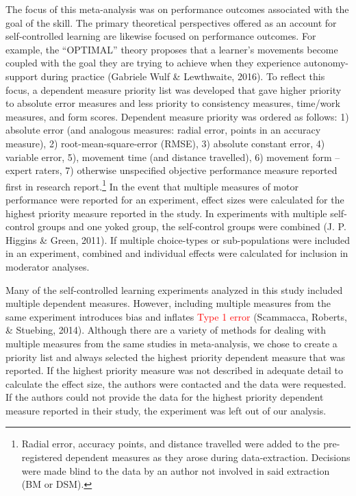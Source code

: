 \documentclass[
  english,
  man,floatsintext]{apa7}
\begin{document}
The focus of this meta-analysis was on performance outcomes associated with the goal of the skill. The primary theoretical perspectives offered as an account for self-controlled learning are likewise focused on performance outcomes. For example, the ``OPTIMAL'' theory proposes that a learner's movements become coupled with the goal they are trying to achieve when they experience autonomy-support during practice (Gabriele Wulf \& Lewthwaite, 2016). To reflect this focus, a dependent measure priority list was developed that gave higher priority to absolute error measures and less priority to consistency measures, time/work measures, and form scores. Dependent measure priority was ordered as follows: 1) absolute error (and analogous measures: radial error, points in an accuracy measure), 2) root-mean-square-error (RMSE), 3) absolute constant error, 4) variable error, 5), movement time (and distance travelled), 6) movement form -- expert raters, 7) otherwise unspecified objective performance measure reported first in research report.\footnote{Radial error, accuracy points, and distance travelled were added to the pre-registered dependent measures as they arose during data-extraction. Decisions were made blind to the data by an author not involved in said extraction (BM or DSM).} In the event that multiple measures of motor performance were reported for an experiment, effect sizes were calculated for the highest priority measure reported in the study. In experiments with multiple self-control groups and one yoked group, the self-control groups were combined (J. P. Higgins \& Green, 2011). If multiple choice-types or sub-populations were included in an experiment, combined and individual effects were calculated for inclusion in moderator analyses.

Many of the self-controlled learning experiments analyzed in this study included multiple dependent measures. However, including multiple measures from the same experiment introduces bias and inflates \textcolor{red}{Type 1 error} (Scammacca, Roberts, \& Stuebing, 2014). Although there are a variety of methods for dealing with multiple measures from the same studies in meta-analysis, we chose to create a priority list and always selected the highest priority dependent measure that was reported. If the highest priority measure was not described in adequate detail to calculate the effect size, the authors were contacted and the data were requested. If the authors could not provide the data for the highest priority dependent measure reported in their study, the experiment was left out of our analysis.
\end{document}

